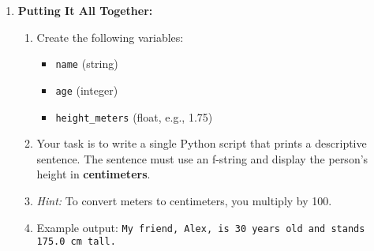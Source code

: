 \begin{enumerate}
    \item \textbf{Putting It All Together:}
    \begin{enumerate}
        \item Create the following variables:
        \begin{itemize}
            \item \texttt{name} (string)
            \item \texttt{age} (integer)
            \item \texttt{height_meters} (float, e.g., 1.75)
        \end{itemize}
        \item Your task is to write a single Python script that prints a descriptive sentence. The sentence must use an f-string and display the person's height in \textbf{centimeters}.
        \item \textit{Hint:} To convert meters to centimeters, you multiply by 100.
        \item Example output: \texttt{My friend, Alex, is 30 years old and stands 175.0 cm tall.}
    \end{enumerate}

\end{enumerate}


